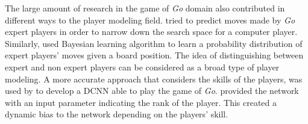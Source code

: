 The large amount of research in the game of \textit{Go} domain also contributed in different ways to the player modeling field. \textcite{sutskever_mimicking_2008} tried to predict moves made by \textit{Go} expert players in order to narrow down the search space for a computer player. Similarly, \textcite{stern_bayesian_2006} used Bayesian learning algorithm to learn a probability distribution of expert players' moves given a board position.
The idea of distinguishing between expert and non expert players can be considered as a broad type of player modeling. A more accurate approach that considers the skills of the players, was used by  \textcite{maddison_move_2014} to develop a \acf{DCNN} able to play the game of \textit{Go}. \citeauthor{maddison_move_2014} provided the network with an input parameter indicating the rank of the player. This created a dynamic bias to the network depending on the players' skill. 

